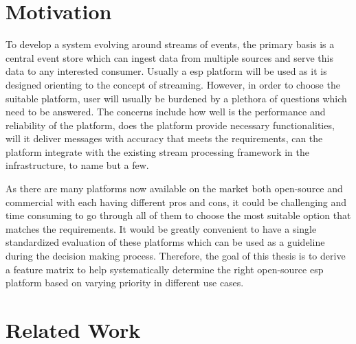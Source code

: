 \section{Motivation}
To develop a system evolving around streams of events, the primary basis is a central event store which can ingest data from multiple sources and serve this data to any interested consumer. Usually a \acrshort{esp} platform will be used as it is designed orienting to the concept of streaming. However, in order to choose the suitable platform, user will usually be burdened by a plethora of questions which need to be answered. The concerns include how well is the performance and reliability of the platform, does the platform provide necessary functionalities, will it deliver messages with accuracy that meets the requirements, can the platform integrate with the existing stream processing framework in the infrastructure, to name but a few.

As there are many platforms now available on the market both open-source and commercial with each having different pros and cons, it could be challenging and time consuming to go through all of them to choose the most suitable option that matches the requirements. It would be greatly convenient to have a single standardized evaluation of these platforms which can be used as a guideline during the decision making process. Therefore, the goal of this thesis is to derive a feature matrix to help systematically determine the right open-source \acrshort{esp} platform based on varying priority in different use cases. 


\section{Related Work}

